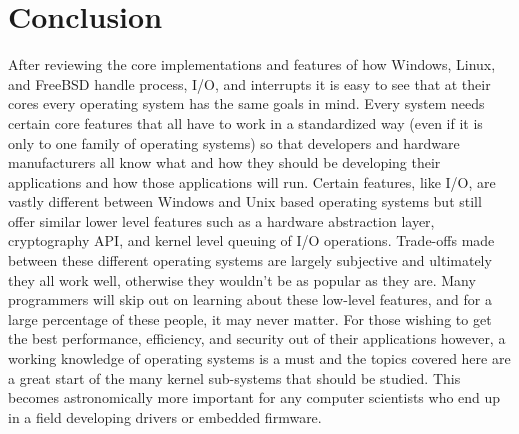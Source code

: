 \section{Conclusion}
After reviewing the core implementations and features of how Windows, Linux, and FreeBSD handle process, I/O, and interrupts it is easy to see that at their cores every operating system has the same goals in mind. Every system needs certain core features that all have to work in a standardized way (even if it is only to one family of operating systems) so that developers and hardware manufacturers all know what and how they should be developing their applications and how those applications will run. Certain features, like I/O, are vastly different between Windows and Unix based operating systems but still offer similar lower level features such as a hardware abstraction layer, cryptography API, and kernel level queuing of I/O operations. Trade-offs made between these different operating systems are largely subjective and ultimately they all work well, otherwise they wouldn't be as popular as they are. Many programmers will skip out on learning about these low-level features, and for a large percentage of these people, it may never matter. For those wishing to get the best performance, efficiency, and security out of their applications however, a working knowledge of operating systems is a must and the topics covered here are a great start of the many kernel sub-systems that should be studied. This becomes astronomically more important for any computer scientists who end up in a field developing drivers or embedded firmware. 